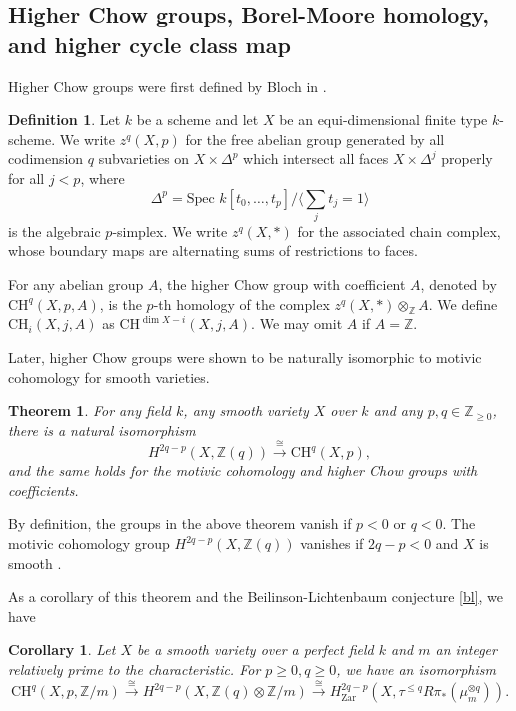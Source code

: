 \documentclass{amsart}
\newtheorem{thm}[theorem]{Theorem}
\newtheorem{cor}[theorem]{Corollary}
\theoremstyle{definition}
\newtheorem{defn}[theorem]{Definition}
\theoremstyle{remark}
\newcommand{\mbb}{\mathbb}
\newcommand{\ZZ}{\mbb{Z}}
\newcommand{\SP}{\text{Spec }}
\begin{document}
\subsection{Higher Chow groups, Borel-Moore homology, and higher cycle class map}\label{sec:bm}
Higher Chow groups were first defined by Bloch in \cite{Bloch_higher_Chow}. 
\begin{defn}\label{def:higherchow}
    Let $k$ be a scheme and let $X$ be an equi-dimensional finite type $k$-scheme. We write $z^q(X,p)$ for the free abelian group generated by all codimension $q$ subvarieties on $X \times \Delta^p$ which intersect all faces $X \times \Delta^j$ properly for all $j<p$, where $$\Delta^p=\SP k[t_0, \ldots, t_p]/\langle \sum_j t_j=1 \rangle$$ is the algebraic $p$-simplex. 
    We write $z^q(X, *)$ for the associated chain complex, whose boundary maps are alternating sums of restrictions to faces. 
    
    For any abelian group $A$, the higher Chow group with coefficient $A$, denoted by $\text{CH}^q(X, p, A)$, is the $p$-th homology of the complex $z^q(X, *)\otimes_\ZZ A$. 
    We define $\text{CH}_i(X, j, A)$ as $\text{CH}^{\dim X-i}(X, j, A)$. We may omit $A$ if $A=\ZZ$.
\end{defn}
Later, higher Chow groups were shown to be naturally isomorphic to motivic cohomology for smooth varieties. 
\begin{thm}\cite[Corollary 2]{Voevodsky_higherChow_motivic}
    For any field $k$, any smooth variety $X$ over $k$ and any $p, q \in \ZZ_{\geq 0}$, there is a natural isomorphism
    \[
    H^{2q-p}(X, \ZZ(q)) \xrightarrow{\cong} \text{CH}^q(X, p),
    \]
    and the same holds for the motivic cohomology and higher Chow groups with coefficients.
\end{thm}
By definition, the groups in the above theorem vanish if $p<0$ or $q<0$.
The motivic cohomology group $H^{2q-p}(X, \ZZ(q))$ vanishes if $2q-p<0$ and $X$ is smooth \cite[Theorem 19.3]{Mazza_Voevodsky_Weibel_Lecture_motivic_cohomology}.

As a corollary of this theorem and the Beilinson-Lichtenbaum conjecture \ref{bl},
we have
\begin{cor}\label{cor:chow_zar}
    Let $X$ be a smooth variety over a perfect field $k$ and $m$ an integer relatively prime to the characteristic. For $p\geq 0, q \geq 0$, we have an isomorphism
    \[
    \text{CH}^q(X, p, \ZZ/m)\xrightarrow{\cong} H^{2q-p}(X, \ZZ(q)\otimes\ZZ/m) \xrightarrow{\cong} H_{\text{Zar}}^{2q-p}(X, \tau^{\leq q}R\pi_*(\mu_m^{\otimes q})).
    \]
\end{cor}
\end{document}
